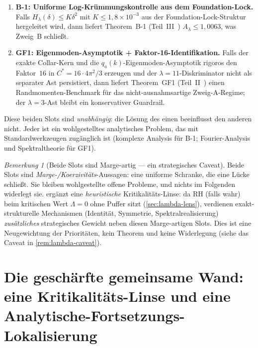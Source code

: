 \documentclass[12pt,a4paper]{article}
\theoremstyle{definition}
\theoremstyle{remark}
\newtheorem{remark}[theorem]{Bemerkung}
\begin{document}
\begin{enumerate}
  \item \textbf{B-1: Uniforme Log-Krümmungskontrolle aus dem Foundation-Lock.}
    Falls $H_\lambda(\delta) \leq K\delta^2$ mit
    $K \leq 1{,}8\times 10^{-3}$ aus der Foundation-Lock-Struktur
    hergeleitet wird, dann liefert Theorem~B-1
    (Teil~III~\cite{Geiger2026partIII})
    $A_\lambda \leq 1{,}0063$, was Zweig~B schließt.
  \item \textbf{GF1: Eigenmoden-Asymptotik + Faktor-16-Identifikation.}
    Falls der exakte Collar-Kern und die $q_a(k)$-Eigenmoden-Asymptotik
    rigoros den Faktor~$16$ in $C^* = 16\cdot 4\pi^2/3$ erzeugen und der
    $\lambda=11$-Diskriminator nicht als separater Ast persistiert, dann liefert
    Theorem~GF1 (Teil~II~\cite{Geiger2026partII}) einen
    Randmomenten-Benchmark für das nicht-ausnahmsartige Zweig-A-Regime;
    der $\lambda=3$-Ast bleibt ein konservativer Guardrail.
\end{enumerate}

Diese beiden Slots sind \emph{unabhängig}: die Lösung des einen beeinflusst
den anderen nicht. Jeder ist ein wohlgestelltes analytisches Problem, das mit
Standardwerkzeugen zugänglich ist (komplexe Analysis für B-1; Fourier-Analysis
und Spektraltheorie für GF1).

\begin{remark}[Beide Slots sind Marge-artig --- ein strategisches Caveat]
\label{rem:slots-margin}
Beide Slots sind \emph{Marge-/Koerzivitäts}-Aussagen: eine uniforme Schranke, die
eine Lücke schließt. Sie bleiben wohlgestellte offene Probleme, und nichts im
Folgenden widerlegt sie.  ergänzt eine \emph{heuristische}
Kritikalitäts-Linse: da RH (falls wahr) beim kritischen Wert $\Lambda=0$ ohne Puffer
sitzt (\cref{sec:lambda-lens}), verdienen exakt-strukturelle Mechanismen (Identität,
Symmetrie, Spektralrealisierung) \emph{zusätzliches} strategisches Gewicht neben
diesen Marge-artigen Slots. Dies ist eine Neugewichtung der Prioritäten, kein
Theorem und keine Widerlegung (siehe das Caveat in \cref{rem:lambda-caveat}).
\end{remark}


\section{Die geschärfte gemeinsame Wand: eine Kritikalitäts-Linse und eine Analytische-Fortsetzungs-Lokalisierung}
\label{sec:sharpened-wall}
\end{document}
